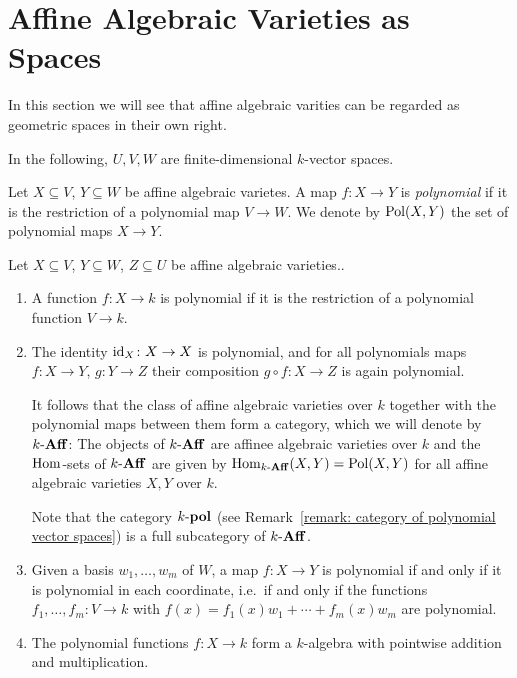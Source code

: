 \section{Affine Algebraic Varieties as Spaces}
\label{section: geometry of affine algebraic varietes}


\begin{fluff}
  In this section we will see that affine algebraic varities can be regarded as geometric spaces in their own right.
\end{fluff}


\begin{conventions}
  In the following, $U, V, W$ are finite-dimensional $k$-vector spaces.
\end{conventions}


\begin{definition}
  Let $X \subseteq V$, $Y \subseteq W$ be affine algebraic varietes.
  A map $f \colon X \to Y$ is \emph{polynomial} if it is the restriction of a polynomial map $V \to W$.
  We denote by $\operatorname{Pol}(X,Y)$ the set of polynomial maps $X \to Y$.
\end{definition}


\begin{remark}
  Let $X \subseteq V$, $Y \subseteq W$, $Z \subseteq U$ be affine algebraic varieties..
  \begin{enumerate}
    \item
      A function $f \colon X \to k$ is polynomial if it is the restriction of a polynomial function $V \to k$.
    \item
      The identity $\operatorname{id}_X \colon X \to X$ is polynomial, and for all polynomials maps $f \colon X \to Y$, $g \colon Y \to Z$ their composition $g \circ f \colon X \to Z$ is again polynomial.
      
      It follows that the class of affine algebraic varieties over $k$ together with the polynomial maps between them form a category, which we will denote by $k\text{-}\mathbf{Aff}$:
      The objects of $k\text{-}\mathbf{Aff}$ are affinee algebraic varieties over $k$ and the $\operatorname{Hom}$-sets of $k\text{-}\mathbf{Aff}$ are given by $\operatorname{Hom}_{k\text{-}\mathbf{Aff}}(X,Y) = \operatorname{Pol}(X,Y)$ for all affine algebraic varieties $X, Y$ over $k$.
      
      Note that the category $k\text{-}\mathbf{pol}$ (see Remark~\ref{remark: category of polynomial vector spaces}) is a full subcategory of $k\text{-}\mathbf{Aff}$.
    \item
      Given a basis $w_1, \dotsc, w_m$ of $W$, a map $f \colon X \to Y$ is polynomial if and only if it is polynomial in each coordinate, i.e.\ if and only if the functions $f_1, \dotsc, f_m \colon V \to k$ with $f(x) = f_1(x) w_1 + \dotsb + f_m(x) w_m$ are polynomial.
    \item
      The polynomial functions $f \colon X \to k$ form a $k$-algebra with pointwise addition and multiplication.
  \end{enumerate}
\end{remark}


